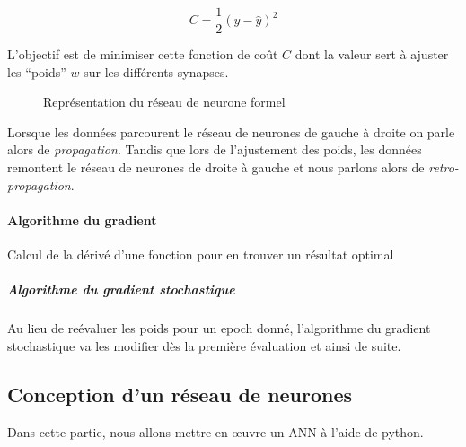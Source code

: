 \documentclass{report}
\begin{document}
	\begin{equation}
		\label{eq:cost_function_1} C = \frac{1}{2}(y-\hat y)^2
	\end{equation}

    L'objectif est de minimiser cette fonction de coût $C$ dont la valeur sert à ajuster les ``poids'' $w$ sur les différents synapses.
\begin{figure}[ht]	
		\centering
		\caption{Représentation du réseau de neurone formel}
	\end{figure}
	Lorsque les données parcourent le réseau de neurones de gauche à droite on parle alors de \textit{propagation}.
	Tandis que lors de l'ajustement des poids, les données remontent le réseau de neurones de droite à gauche et nous parlons alors de \textit{retro-propagation}.

	\paragraph{Algorithme du gradient}
	Calcul de la dérivé d'une fonction pour en trouver un résultat optimal

	\subparagraph{Algorithme du gradient stochastique}
	Au lieu de reévaluer les poids pour un epoch donné, l'algorithme du gradient stochastique va les modifier dès la première évaluation et ainsi de suite.

	\subsection{Conception d'un réseau de neurones}
	Dans cette partie, nous allons mettre en \oe uvre un \gls{ANN} à l'aide de python.

		
\end{document}
